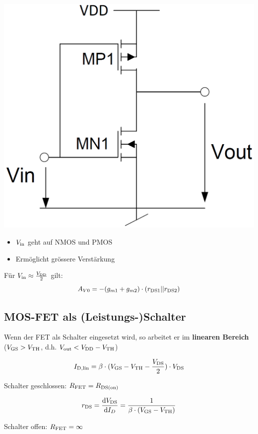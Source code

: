 \begin{minipage}[c]{0.34\columnwidth}
    \includegraphics[width=\columnwidth]{images/push_pull_digital_inverter.png}
\end{minipage}
\hfill
\begin{minipage}[c]{0.64\columnwidth}
    \begin{itemize}
        \item $V_{\rm in}$ geht auf NMOS und PMOS
        \item Ermöglicht grössere Verstärkung
    \end{itemize}
        
    \vspace{0.3cm}
    Für $V_{\rm in} \approx \frac{V_{\rm DD}}{2}$ gilt:
    $$ A_{V0} = -(g_{m1} + g_{m2}) \cdot (r_{\rm DS1} || r_{\rm DS2}) $$
\end{minipage}


\subsection{MOS-FET als (Leistungs-)Schalter}
Wenn der FET als Schalter eingesetzt wird, so arbeitet er im \textbf{linearen Bereich} \\
($V_{\rm GS} > V_{\rm TH}$, d.h. $V_{\rm out} < V_{\rm DD} - V_{\rm TH} $)

    $$ I_{\rm D,lin} = \beta \cdot ( V_{\rm GS} - V_{\rm TH} - \frac{V_{\rm DS}}{2} ) \cdot V_{\rm DS} $$
\begin{minipage}[c]{0.39\columnwidth}
    \begin{center}
        Schalter geschlossen: $R_{\rm FET} = R_{\rm DS(on)} $
    \end{center}
\end{minipage}
\hfill
\begin{minipage}[c]{0.59\columnwidth}
    $$ r_{\rm DS} = \dfrac{\mathop{} \! \mathrm{d} V_{\rm DS}}{\mathop{} \! \mathrm{d} I_D} = \frac{1}{\beta \cdot (V_{\rm GS} - V_{\rm TH})}  $$
    \begin{center}
        Schalter offen: $R_{\rm FET} = \infty$ 
    \end{center}
\end{minipage}


